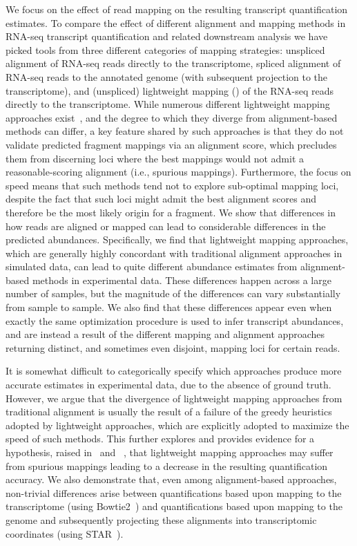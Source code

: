 We focus on the effect of read
mapping on the resulting transcript quantification estimates. To compare the
effect of different alignment and mapping methods in RNA-seq transcript
quantification and related downstream analysis we have picked tools from three
different categories of mapping strategies: unspliced alignment of RNA-seq reads
directly to the transcriptome, spliced alignment of RNA-seq reads to the
annotated genome (with subsequent projection to the transcriptome), and
(unspliced) lightweight mapping (\qm) of the RNA-seq reads directly to the
transcriptome. While numerous different lightweight mapping approaches
exist~\citep{salmon,sailfish,rnaskim,kallisto,rapmap,fleximer}, and the degree to
which they diverge from alignment-based methods can differ, a key feature
shared by such approaches is that they do not validate predicted fragment mappings
via an alignment score, which precludes them from discerning loci where the best mappings 
would not admit a reasonable-scoring alignment (i.e., spurious mappings). Furthermore, 
the focus on speed means that such methods tend not to explore sub-optimal mapping loci, 
despite the fact that such loci might admit the best alignment scores and therefore be 
the most likely origin for a fragment. We show that differences in how reads are aligned 
or mapped can lead to considerable differences in the predicted abundances. Specifically, we
find that lightweight mapping approaches, which are generally highly
concordant with traditional alignment approaches in simulated data, can lead to
quite different abundance estimates from alignment-based methods in experimental
data. These differences happen across a large number
of samples, but the magnitude of the differences can vary substantially from sample to sample. We
also find that these differences appear even when exactly the same optimization procedure
is used to infer transcript abundances, and are instead a result of the different
mapping and alignment approaches returning distinct, and sometimes even
disjoint, mapping loci for certain reads.

It is somewhat difficult to categorically specify which approaches produce more accurate 
estimates in experimental data, due to the absence of ground truth. However,
we argue that the divergence of lightweight mapping approaches from traditional
alignment is usually the result of a failure of the greedy heuristics adopted by
lightweight approaches, which are explicitly adopted to maximize the speed of
such methods. This further explores and provides evidence for a hypothesis, raised
in~\citet{selaln} and ~\citet{heraem}, that lightweight mapping approaches may suffer from
spurious mappings leading to a decrease in the resulting quantification
accuracy. We also demonstrate that, even among alignment-based approaches,
non-trivial differences arise between quantifications based upon mapping to the
transcriptome (using Bowtie2~\citep{bowtie2}) and quantifications based upon
mapping to the genome and subsequently projecting these alignments into
transcriptomic coordinates (using STAR~\citep{star}).

